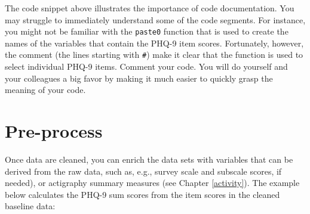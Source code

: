 \documentclass[]{book}
\newenvironment{Shaded}{\begin{snugshade}}{\end{snugshade}}
\newcommand{\KeywordTok}[1]{\textcolor[rgb]{0.13,0.29,0.53}{\textbf{#1}}}
\newcommand{\DataTypeTok}[1]{\textcolor[rgb]{0.13,0.29,0.53}{#1}}
\newcommand{\DecValTok}[1]{\textcolor[rgb]{0.00,0.00,0.81}{#1}}
\newcommand{\StringTok}[1]{\textcolor[rgb]{0.31,0.60,0.02}{#1}}
\newcommand{\CommentTok}[1]{\textcolor[rgb]{0.56,0.35,0.01}{\textit{#1}}}
\newcommand{\OtherTok}[1]{\textcolor[rgb]{0.56,0.35,0.01}{#1}}
\newcommand{\OperatorTok}[1]{\textcolor[rgb]{0.81,0.36,0.00}{\textbf{#1}}}
\newcommand{\NormalTok}[1]{#1}
\begin{document}
The code snippet above illustrates the importance of code documentation.
You may struggle to immediately understand some of the code segments.
For instance, you might not be familiar with the \texttt{paste0}
function that is used to create the names of the variables that contain
the PHQ-9 item scores. Fortunately, however, the comment (the lines
starting with \texttt{\#}) make it clear that the function is used to
select individual PHQ-9 items. Comment your code. You will do yourself
and your colleagues a big favor by making it much easier to quickly
grasp the meaning of your code.

\section{Pre-process}\label{pre-process}

Once data are cleaned, you can enrich the data sets with variables that
can be derived from the raw data, such as, e.g., survey scale and
subscale scores, if needed), or actigraphy summary measures (see Chapter
\ref{activity}). The example below calculates the PHQ-9 sum scores from
the item scores in the cleaned baseline data:

\begin{Shaded}
\end{Shaded}
\end{document}
